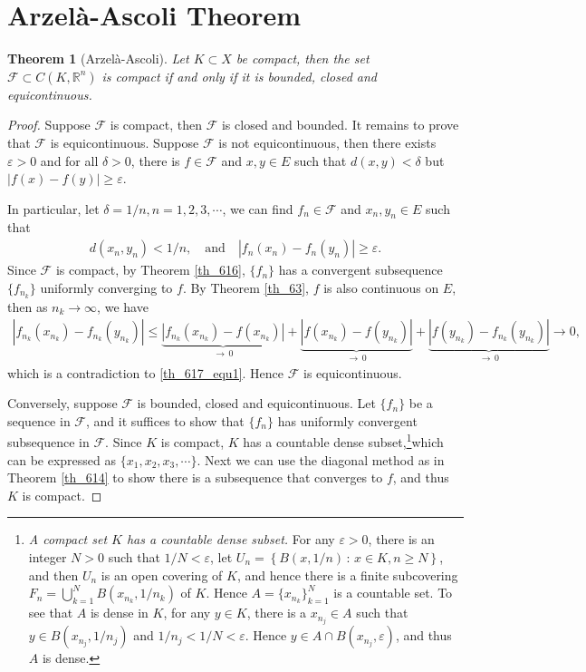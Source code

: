 \documentclass[10pt]{book}
\newtheorem{theorem}{Theorem}[chapter]
\theoremstyle{definition}
\numberwithin{equation}{chapter}
\begin{document}
\medskip




\section{Arzelà-Ascoli Theorem}

\begin{theorem}[Arzelà-Ascoli]\label{th_617}
Let $K \subset X$ be compact, then the set $\mathcal{F} \subset C(K,\mathbb{R}^n)$ is compact if and only if it is bounded, closed and equicontinuous.
\end{theorem}
\begin{proof}
Suppose $\mathcal{F}$ is compact, then $\mathcal{F}$ is closed and bounded. It remains to prove that $\mathcal{F}$ is equicontinuous. Suppose $\mathcal{F}$ is not equicontinuous, then there exists $\varepsilon > 0$ and for all $\delta > 0$, there is $f \in \mathcal{F}$ and $x, y \in E$ such that $d(x,y) < \delta$ but $\left|f(x) - f(y)\right| \geq \varepsilon$. 

In particular, let $\delta = 1/n, n = 1,2,3,\cdots$, we can find $f_n \in \mathcal{F}$ and $x_n, y_n \in E$ such that
\begin{align}\label{th_617_equ1}
    d(x_n,y_n) < 1/n, \quad \text{and} \quad \left|f_n(x_n) - f_n(y_n)\right| \geq \varepsilon.
\end{align}
Since $\mathcal{F}$ is compact, by Theorem \ref{th_616}, $\{f_n\}$ has a convergent subsequence $\{f_{n_k}\}$ uniformly converging to $f$. By Theorem \ref{th_63}, $f$ is also continuous on $E$, then as $n_k \to \infty$, we have
\begin{align*}
    \left|f_{n_k}(x_{n_k}) - f_{n_k}(y_{n_k})\right| \leq \underbrace{\left|f_{n_k}(x_{n_k}) - f(x_{n_k})\right|}_{\to\,0} + \underbrace{\left|f(x_{n_k}) - f(y_{n_k})\right|}_{\to\,0} + \underbrace{\left|f(y_{n_k}) - f_{n_k}(y_{n_k})\right|}_{\to\,0} \to 0,
\end{align*}
which is a contradiction to \eqref{th_617_equ1}. Hence $\mathcal{F}$ is equicontinuous.

Conversely, suppose $\mathcal{F}$ is bounded, closed and equicontinuous. Let $\{f_n\}$ be a sequence in $\mathcal{F}$, and it suffices to show that $\{f_n\}$ has uniformly convergent subsequence in $\mathcal{F}$. Since $K$ is compact, $K$ has a countable dense subset,\footnote{{\em A compact set $K$ has a countable dense subset.} For any $\varepsilon > 0$, there is an integer $N > 0$ such that $1/N < \varepsilon$, let $U_n = \left\{B(x,1/n) \,:\, x \in K, n \geq N\right\}$, and then $U_n$ is an open covering of $K$, and hence there is a finite subcovering $F_n = \bigcup^N_{k=1} B(x_{n_k},1/n_k)$ of $K$. Hence $A = \{x_{n_k}\}^N_{k=1}$ is a countable set. To see that $A$ is dense in $K$, for any $y \in K$, there is a $x_{n_j} \in A$ such that $y \in B(x_{n_j},1/n_j)$ and $1/n_j < 1/N < \varepsilon$. Hence $y \in A \cap B(x_{n_j}, \varepsilon)$, and thus $A$ is dense.}which can be expressed as $\{x_1, x_2, x_3, \cdots\}$. Next we can use the diagonal method as in Theorem \ref{th_614} to show there is a subsequence that converges to $f$, and thus $K$ is compact.
\end{proof}
\end{document}
